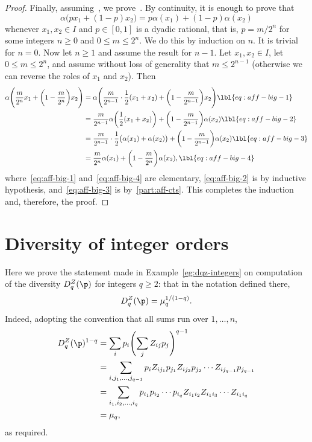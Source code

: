 \begin{proof}
Finally, assuming~, we prove~.  By
continuity, it is enough to prove that
\[
\alpha\bigl( px_1 + (1 - p)x_2 \bigr)
=
p\alpha(x_1) + (1 - p)\alpha(x_2)
\]
whenever $x_1, x_2 \in I$ and $p \in [0, 1]$ is a dyadic rational, that is,
$p = m/2^n$ for some integers $n \geq 0$ and $0 \leq m \leq 2^n$.  We do
this by induction on $n$.  It is trivial for $n = 0$.  Now let $n \geq 1$
and assume the result for $n - 1$.  Let $x_1, x_2 \in I$, let $0 \leq m
\leq 2^n$, and assume without loss of generality that $m \leq 2^{n - 1}$
(otherwise we can reverse the roles of $x_1$ and $x_2$).  Then
% 
\begin{align}
\alpha \Biggl(
\frac{m}{2^n} x_1 + \biggl( 1 - \frac{m}{2^n} \biggr) x_2
\Biggr) &
=
\alpha \Biggl(
\frac{m}{2^{n - 1}} \cdot \frac{1}{2}(x_1 + x_2)
+
\biggl( 1 - \frac{m}{2^{n - 1}} \biggr) x_2
\Biggr) 
\lbl{eq:aff-big-1}    \\
&
=
\frac{m}{2^{n - 1}} \alpha\biggl( \frac{1}{2} (x_1 + x_2) \biggr)
+
\biggl( 1 - \frac{m}{2^{n - 1}} \biggr) \alpha(x_2)
\lbl{eq:aff-big-2}    \\
&
=
\frac{m}{2^{n - 1}} \cdot \frac{1}{2} 
\bigl( \alpha(x_1) + \alpha(x_2) \bigr) 
+
\biggl( 1 - \frac{m}{2^{n - 1}} \biggr) \alpha(x_2)       
\lbl{eq:aff-big-3}    \\
&
=
\frac{m}{2^n} \alpha(x_1) + \biggl( 1 - \frac{m}{2^n} \biggr) \alpha(x_2),
\lbl{eq:aff-big-4}
\end{align}
% 
where~\eqref{eq:aff-big-1} and~\eqref{eq:aff-big-4} are elementary,
\eqref{eq:aff-big-2} is by inductive hypothesis, and~\eqref{eq:aff-big-3}
is by~\eqref{part:aff-cts}.  This completes the induction
and, therefore, the proof.
\end{proof}


\section{Diversity of integer orders}


Here we prove the statement made in Example~\ref{eg:dqz-integers}
on computation of the diversity $D_q^Z(\p)$ for integers $q \geq 2$: that
in the notation defined there,
\[
D_q^Z(\p) = \mu_q^{1/(1 - q)}.
\]
Indeed, adopting the convention that all sums run over $1, \ldots, n$, 
% 
\begin{align*}
D_q^Z(\p)^{1 - q}       &
=
\sum_i p_i 
\Biggl( \sum_j Z_{ij} p_j \Biggr)^{q - 1}     \\
&=
\sum_{i, j_1, \ldots, j_{q - 1}}
p_i Z_{i j_1} p_{j_1} Z_{i j_2} p_{j_2} 
\cdots 
Z_{i j_{q - 1}} p_{j_{q - 1}}  \\
&= 
\sum_{i_1, i_2, \ldots, i_q}
p_{i_1} p_{i_2} \cdots p_{i_q} 
Z_{i_1 i_2} Z_{i_1  i_3} \cdots Z_{i_1  i_q}   \\
&
=
\mu_q,
\end{align*}
% 
as required.


